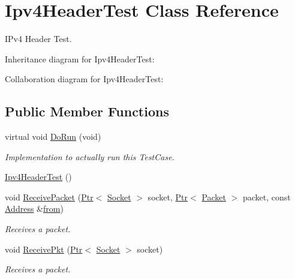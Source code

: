 \hypertarget{classIpv4HeaderTest}{}\section{Ipv4\+Header\+Test Class Reference}
\label{classIpv4HeaderTest}


I\+Pv4 Header Test.  




Inheritance diagram for Ipv4\+Header\+Test\+:


Collaboration diagram for Ipv4\+Header\+Test\+:
\subsection*{Public Member Functions}
\begin{DoxyCompactItemize}
\item 
virtual void \hyperlink{classIpv4HeaderTest_ad9026591beb17db0d9cbff0c34f9f69d}{Do\+Run} (void)
\begin{DoxyCompactList}\small\item\em Implementation to actually run this Test\+Case. \end{DoxyCompactList}\item 
\hyperlink{classIpv4HeaderTest_acb1eb9046565342e968e85705781555c}{Ipv4\+Header\+Test} ()
\item 
void \hyperlink{classIpv4HeaderTest_aa6e29b55cab04dadbdadb52c9ba15e87}{Receive\+Packet} (\hyperlink{classns3_1_1Ptr}{Ptr}$<$ \hyperlink{classns3_1_1Socket}{Socket} $>$ socket, \hyperlink{classns3_1_1Ptr}{Ptr}$<$ \hyperlink{classns3_1_1Packet}{Packet} $>$ packet, const \hyperlink{classns3_1_1Address}{Address} \&\hyperlink{lte__amc_8m_a1b4c81ff74eb1a626b5ade44c81004b3}{from})
\begin{DoxyCompactList}\small\item\em Receives a packet. \end{DoxyCompactList}\item 
void \hyperlink{classIpv4HeaderTest_ae06256e56359912140540a0c04c7dc78}{Receive\+Pkt} (\hyperlink{classns3_1_1Ptr}{Ptr}$<$ \hyperlink{classns3_1_1Socket}{Socket} $>$ socket)
\begin{DoxyCompactList}\small\item\em Receives a packet. \end{DoxyCompactList}\end{DoxyCompactItemize}
